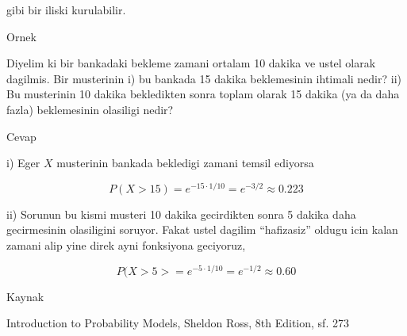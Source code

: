 \documentclass[12pt,fleqn]{article}\usepackage{../common}
\begin{document}
gibi bir iliski kurulabilir. 

Ornek

Diyelim ki bir bankadaki bekleme zamani ortalam 10 dakika ve ustel olarak
dagilmis. Bir musterinin i) bu bankada 15 dakika beklemesinin ihtimali
nedir? ii) Bu musterinin 10 dakika bekledikten sonra toplam olarak 15
dakika (ya da daha fazla) beklemesinin olasiligi nedir? 

Cevap

i) Eger $X$ musterinin bankada bekledigi zamani temsil ediyorsa

\[ P(X>15) = e^{-15 \cdot 1/10} = e^{-3/2} \approx 0.223 \]

ii) Sorunun bu kismi musteri 10 dakika gecirdikten sonra 5 dakika daha
gecirmesinin olasiligini soruyor. Fakat ustel dagilim ``hafizasiz'' oldugu
icin kalan zamani alip yine direk ayni fonksiyona geciyoruz, 

\[ P(X>5> = e^{-5 \cdot 1/10} = e^{-1/2} \approx 0.60\]

Kaynak

Introduction to Probability Models, Sheldon Ross, 8th Edition, sf. 273
\end{document}
